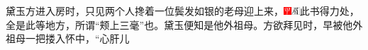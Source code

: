 黛玉方进入房时，只见两个人搀着一位鬓发如银的老母迎上来，{\includegraphics[width=3mm]{../Images/00002}\includegraphics[width=3mm]{../Images/00010}\footnotesize \kaishu 此书得力处，全是此等地方，所谓“颊上三毫”也。}黛玉便知是他外祖母。方欲拜见时，早被他外祖母一把搂入怀中，“心肝儿